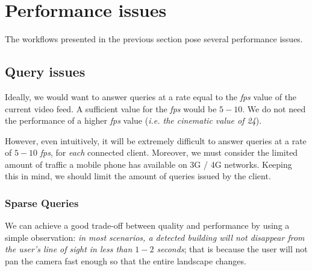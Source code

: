 \documentclass[a4paper,onecolumn,oneside,titlepage,12pt]{report}
\begin{document}
\chapter{Performance issues}
The workflows presented in the previous section pose several performance issues.
\section{Query issues}
Ideally, we would want to answer queries at a rate equal to the \emph{fps} value of the current video feed. A sufficient value for the \emph{fps} would be $5-10$. We do not need the performance of a higher \emph{fps} value (\emph{i.e. the cinematic value of 24}).

However, even intuitively, it will be extremely difficult to answer queries at a rate of $5-10$ \emph{fps}, for \emph{each} connected client. Moreover, we must consider the limited amount of traffic a mobile phone has available on 3G / 4G networks. Keeping this in mind, we should limit the amount of queries issued by the client.

\subsection{Sparse Queries}
We can achieve a good trade-off between quality and performance by using a simple observation: \emph{in most scenarios, a detected building will not disappear from the user's line of sight in less than $1-2$ seconds}; that is because the user will not pan the camera fast enough so that the entire landscape changes.
\end{document}
